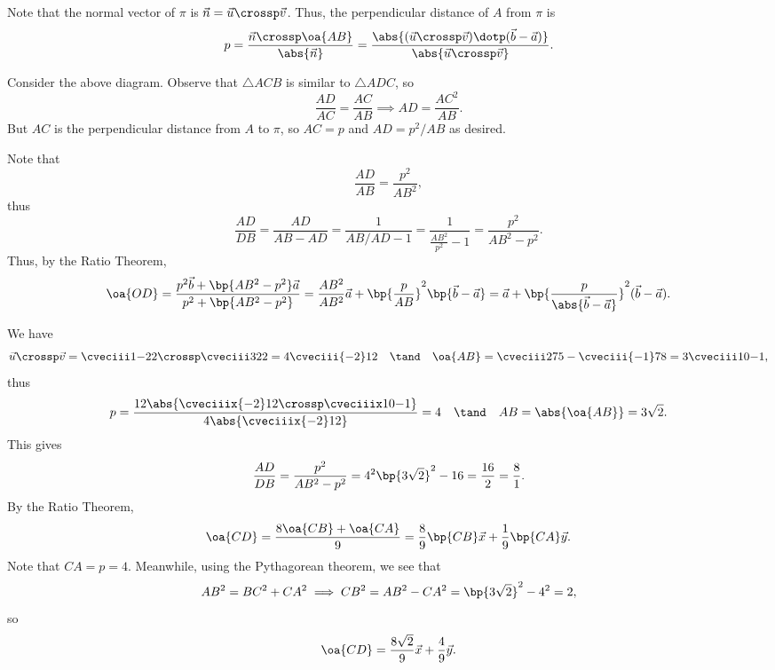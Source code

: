 \begin{solution}
    \begin{ppart}
        Note that the normal vector of $\pi$ is $\vec n = \vec u \crossp \vec v$. Thus, the perpendicular distance of $A$ from $\pi$ is \[p = \frac{\vec n \crossp \oa{AB}}{\abs{\vec n}} = \frac{\abs{(\vec u \crossp \vec v) \dotp (\vec b - \vec a)}}{\abs{\vec u \crossp \vec v}}.\]
    \end{ppart}
    \begin{ppart}
        \begin{center}
        \end{center}

        Consider the above diagram. Observe that $\triangle ACB$ is similar to $\triangle ADC$, so \[\frac{AD}{AC} = \frac{AC}{AB} \implies AD = \frac{AC^2}{AB}.\] But $AC$ is the perpendicular distance from $A$ to $\pi$, so $AC = p$ and $AD = p^2 / AB$ as desired.

        Note that \[\frac{AD}{AB} = \frac{p^2}{AB^2},\] thus \[\frac{AD}{DB} = \frac{AD}{AB - AD} = \frac{1}{AB/AD - 1} = \frac{1}{\frac{AB^2}{p^2} - 1} = \frac{p^2}{AB^2 - p^2}.\] Thus, by the Ratio Theorem, \[\oa{OD} = \frac{p^2 \vec b + \bp{AB^2 - p^2} \vec a}{p^2 + \bp{AB^2 - p^2}} = \frac{AB^2}{AB^2} \vec a + \bp{\frac{p}{AB}}^2 \bp{\vec b - \vec a} = \vec a + \bp{\frac{p}{\abs{\vec b - \vec a}}}^2 (\vec b - \vec a).\]
    \end{ppart}

    We have \[\vec u \crossp \vec v = \cveciii1{-2}2 \crossp \cveciii322 = 4\cveciii{-2}12 \quad \tand \quad \oa{AB} = \cveciii275 - \cveciii{-1}78 = 3\cveciii10{-1},\] thus \[p = \frac{12\abs{\cveciiix{-2}12 \crossp \cveciiix10{-1}}}{4 \abs{\cveciiix{-2}12}} = 4 \quad \tand \quad AB = \abs{\oa{AB}} = 3\sqrt{2}.\] This gives \[\frac{AD}{DB} = \frac{p^2}{AB^2 - p^2} = {4^2}{\bp{3\sqrt2}^2 - 16} = \frac{16}{2} = \frac{8}{1}.\] By the Ratio Theorem, \[\oa{CD} = \frac{8\oa{CB} + \oa{CA}}{9} = \frac{8}{9} \bp{CB} \vec x + \frac19 \bp{CA} \vec y.\] Note that $CA = p = 4$. Meanwhile, using the Pythagorean theorem, we see that \[AB^2 = BC^2 + CA^2 \implies CB^2 = AB^2 - CA^2 = \bp{3\sqrt2}^2 - 4^2 = 2,\] so \[\oa{CD} = \frac{8\sqrt2}{9} \vec x + \frac49 \vec y.\]
\end{solution}